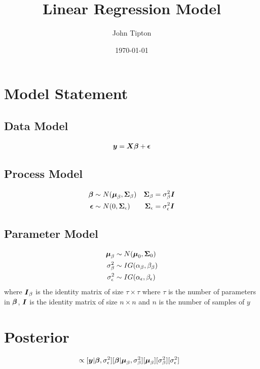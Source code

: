 \documentclass[fleqn]{article}
\title{Linear Regression Model}
\author{John Tipton}
\date{\today}
\def\bm#1{\mbox{\boldmath $#1$}}
\begin{document}
\maketitle

\section{Model Statement}
%
\subsection{Data Model}
\begin{align*}
\bm{y} & = \bm{X} \bm{\beta} + \bm{\epsilon}\\
%
\end{align*}
%
\subsection{Process Model}
%
\begin{align*}
%
\bm{\beta} & \sim N(\bm{\mu}_\beta, \bm{\Sigma}_\beta) & \bm{\Sigma}_\beta &  = \sigma^2_\beta \bm{I}\\
%
\bm{\epsilon} & \sim N(0, \bm{\Sigma}_\epsilon) & \bm{\Sigma}_\epsilon &  = \sigma^2_\epsilon \bm{I}\\
%
\end{align*}
%
\subsection{Parameter Model}
%
\begin{align*}
%
\bm{\mu}_\beta & \sim N(\bm{\mu}_0, \bm{\Sigma}_0)\\
%
\sigma^2_\beta & \sim IG(\alpha_\beta, \beta_\beta)\\
%
\sigma^2_\epsilon & \sim IG(\alpha_\epsilon, \beta_\epsilon)\\
%
\end{align*}
%
where $\bm{I}_\beta$ is the identity matrix of size $\tau \times \tau$ where $\tau$ is the number of parameters in $\bm{\beta}$, $\bm{I}$ is the identity matrix of size $n \times n$ and $n$ is the number of samples of $y$
%
\section{Posterior}
%
\begin{align*}
[\bm{\beta}, \bm{\mu}_\beta, \sigma^2_\beta, \sigma^2_\epsilon | \bm{y}] & \propto [\bm{y} | \bm{\beta}, \sigma^2_\epsilon] [\bm{\beta} | \bm{\mu}_\beta, \sigma^2_\beta] [\bm{\mu}_\beta] [\sigma^2_\beta] [\sigma^2_\epsilon]
\end{align*}
%
\end{document}
